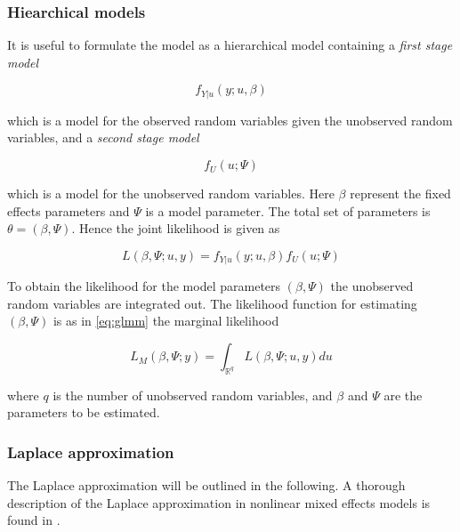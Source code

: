 \documentclass[preprint, 3p,
authoryear]{elsarticle} %
\begin{document}
\hypertarget{hiearchical-models}{%
\subsubsection{Hiearchical models}\label{hiearchical-models}}

It is useful to formulate the model as a hierarchical model containing a
\emph{first stage model}

\begin{equation}\label{eq:firstStage}
  f_{Y|u}(y;u,\beta)
\end{equation}

which is a model for the observed random variables given the unobserved
random variables, and a \emph{second stage model}

\begin{equation}\label{eq:secondStage}
  f_{U}(u; \Psi)
\end{equation}

which is a model for the unobserved random variables. Here \(\beta\)
represent the fixed effects parameters and \(\Psi\) is a model
parameter. The total set of parameters is \(\theta=(\beta, \Psi)\).
Hence the joint likelihood is given as

\begin{equation}\label{eq:jl}
  L(\beta, \Psi; u, y)=f_{Y|u}(y;u,\beta) f_{U}(u; \Psi)
\end{equation}

To obtain the likelihood for the model parameters \((\beta, \Psi)\) the
unobserved random variables are integrated out. The likelihood function
for estimating \((\beta, \Psi)\) is as in \eqref{eq:glmm} the marginal
likelihood

\begin{equation}\label{eq:glmm2}
  L_{M}(\beta, \Psi; y)=\int_{\mathbb{R}^{q}} L(\beta, \Psi;u,y) du
\end{equation}

where \(q\) is the number of unobserved random variables, and \(\beta\)
and \(\Psi\) are the parameters to be estimated.

\hypertarget{laplace-approximation}{%
\subsubsection{Laplace approximation}\label{laplace-approximation}}

The Laplace approximation will be outlined in the following. A thorough
description of the Laplace approximation in nonlinear mixed effects
models is found in \citet{Wolfinger_1997}.
\end{document}
